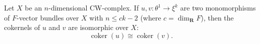 Let $X$ be an $n$-dimensional CW-complex. If $u, v: \theta^1 \to \xi^k$ are two monomorphisms of $F$-vector bundles over $X$ with $n \leq ck - 2$ (where $c = \dim_{\mathbf{R}} F$), then the cokernels of $u$ and $v$ are isomorphic over $X$:
$$\operatorname{coker}(u) \cong \operatorname{coker}(v).$$
